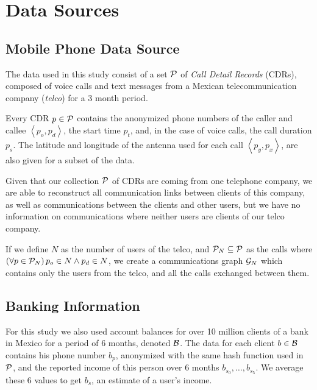 \section{Data Sources}\label{data_sources}

\subsection{Mobile Phone Data Source}

The data used in this study consist of a set \( \mathcal{P} \) of \textit{Call Detail Records} (CDRs), composed of voice calls and text messages from a Mexican telecommunication company (\textit{telco}) for a 3 month period.

Every CDR \( p \in \mathcal{P} \)  contains the anonymized phone numbers of the caller and callee \( \left< p_o, p_d \right> \), the start time \( p_t \), and, in the case of voice calls, the call duration \( p_s \). The latitude and longitude of the antenna used for each call \( \left< p_y, p_x \right> \), are also given for a subset of the data.

Given that our collection \( \mathcal{P} \) of CDRs are coming from one telephone company, we are able to reconstruct all communication links between clients of this company, as well as communications between the clients and other users, but we have no information on communications where neither users are clients of our telco company.

If we define \( N \) as the number of users of the telco, and \( \mathcal{P}_N \subseteq \mathcal{P} \) as the calls where \( \left( \forall p \in \mathcal{P}_N \right) p_o \in N \wedge p_d \in N \), we create a communications graph \( \mathcal{G}_N \) which contains only the users from the telco, and all the calls exchanged between them.


\subsection{Banking Information}

For this study we also used account balances for over 10 million clients of a bank in Mexico for a period of 6 months, denoted \( \mathcal{B} \). The data for each client \( b \in \mathcal{B} \) contains his phone number \( b_p \), anonymized with the same hash function used in \( \mathcal{P} \), and the reported income of this person over 6 months \( b_{s_0}, \ldots, b_{s_5} \). We average these 6 values to get \( b_s \), an estimate of a user's income.

